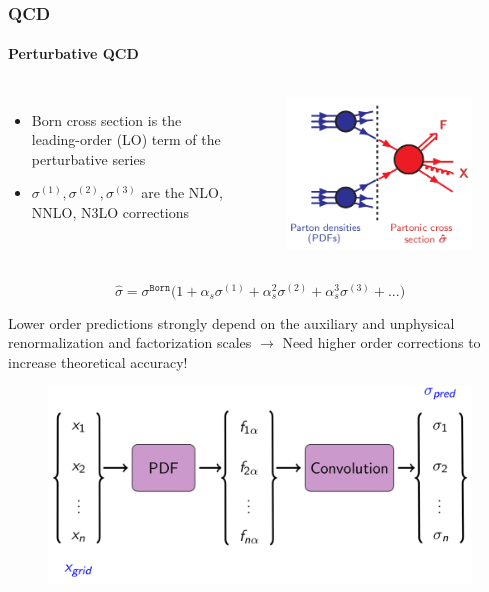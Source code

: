 \documentclass[aspectratio=43]{beamer}
\begin{document}
\begin{frame}

	\frametitle{QCD}
	\framesubtitle{Perturbative QCD}
	
	\begin{columns}
		
		
		\begin{itemize}
			\item Born cross section is the leading-order (LO) term of the perturbative series
			\item $\sigma^{(1)}, \sigma^{(2)}, \sigma^{(3)}$ are the NLO, NNLO, N3LO corrections
		\end{itemize}
		
		\begin{figure}[!htb]
			\includegraphics[width = 5 cm]{plots/section1/factorization_3.png}
		\end{figure}
	
	\end{columns}
	
	\begin{equation}
		\hat{\sigma} = \sigma^{\texttt{Born}} \Big( 1 +
		\alpha_{s} \sigma^{(1)} + 
		\alpha_{s}^{2} \sigma^{(2)} + 
		\alpha_{s}^{3} \sigma^{(3)} + ... \Big) \nonumber
	\end{equation}
	
	Lower order predictions strongly depend on the auxiliary and unphysical renormalization and factorization scales $\longrightarrow$ {\color{red}Need higher order corrections to increase theoretical accuracy!}

\end{frame}

\begin{frame}


\end{frame}

\begin{frame}

	\begin{figure}
		\includegraphics[width = 8.5 cm]{plots/section2/TF_convolution.png}
	\end{figure}

\end{frame}
\end{document}

